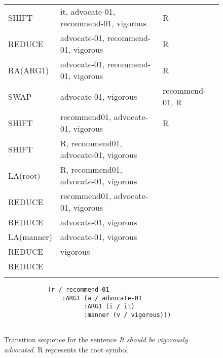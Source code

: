 \documentclass[11pt,a4paper]{article}
\begin{document}
\begin{figure}[!ht]
\begin{center}
\begin{tiny}
\begin{tabular}{l|l|l}
               SHIFT &it, advocate-01,  recommend-01, vigorous& R\\
               REDUCE &advocate-01,  recommend-01, vigorous& R\\
               RA(ARG1) & advocate-01, recommend-01, vigorous& R\\
               SWAP & advocate-01, vigorous & recommend-01, R\\
               SHIFT & recommend01, advocate-01, vigorous &  R\\
               SHIFT & R, recommend01, advocate-01, vigorous &  \\
               LA(root) & R, recommend01, advocate-01, vigorous &  \\
               REDUCE & recommend01, advocate-01, vigorous &  \\
               REDUCE & advocate-01, vigorous &\\
               LA(manner) & advocate-01, vigorous &  \\
               REDUCE & vigorous & \\
               REDUCE  &  & \\
                \vspace{-0.3cm}
      \end{tabular}
   \end{tiny}
    \vspace{1em}

    \begin{center}
      \begin{scriptsize}
      \begin{verbatim}
            (r / recommend-01 
                :ARG1 (a / advocate-01 
                      :ARG1 (i / it) 
                      :manner (v / vigorous)))   
                       
\end{verbatim}
 \vspace{-0.6cm}
\end{scriptsize}
\end{center}
    \caption{Transition sequence for the sentence \emph{It should be vigorously advocated}. 
    R represents the root symbol  }
    \label{parsingexample}
  \end{center}
\end{figure}
  
\end{document}
